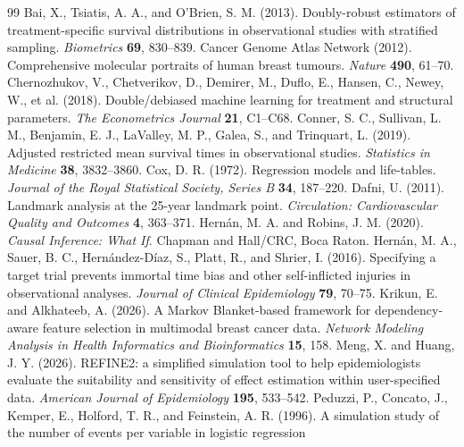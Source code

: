 \documentclass[12pt,letterpaper]{article}
\begin{document}
\begin{thebibliography}{99}
 Bai, X., Tsiatis, A. A., and O'Brien, S. M. (2013).
Doubly-robust estimators of treatment-specific survival distributions in observational studies with stratified sampling.
\textit{Biometrics} \textbf{69}, 830--839.
 Cancer Genome Atlas Network (2012).
Comprehensive molecular portraits of human breast tumours. \textit{Nature} \textbf{490}, 61--70.
 Chernozhukov, V., Chetverikov, D., Demirer, M.,
Duflo, E., Hansen, C., Newey, W., et al. (2018). Double/debiased machine learning for treatment
and structural parameters. \textit{The Econometrics Journal} \textbf{21}, C1--C68.
 Conner, S. C., Sullivan, L. M., Benjamin, E. J., LaValley, M. P.,
Galea, S., and Trinquart, L. (2019). Adjusted restricted mean survival times in observational studies.
\textit{Statistics in Medicine} \textbf{38}, 3832--3860.
 Cox, D. R. (1972). Regression models and life-tables.
\textit{Journal of the Royal Statistical Society, Series B} \textbf{34}, 187--220.
 Dafni, U. (2011). Landmark analysis at the 25-year landmark point.
\textit{Circulation: Cardiovascular Quality and Outcomes} \textbf{4}, 363--371.
 Hern\'an, M. A. and Robins, J. M. (2020).
\textit{Causal Inference: What If}. Chapman and Hall/CRC, Boca Raton.
 Hern\'an, M. A., Sauer, B. C., Hern\'andez-D\'iaz, S.,
Platt, R., and Shrier, I. (2016). Specifying a target trial prevents immortal time bias and
other self-inflicted injuries in observational analyses. \textit{Journal of Clinical Epidemiology} \textbf{79}, 70--75.
 Krikun, E. and Alkhateeb, A. (2026).
A Markov Blanket-based framework for dependency-aware feature selection in multimodal breast cancer data.
\textit{Network Modeling Analysis in Health Informatics and Bioinformatics} \textbf{15}, 158.
 Meng, X. and Huang, J. Y. (2026).
REFINE2: a simplified simulation tool to help epidemiologists evaluate the suitability and sensitivity
of effect estimation within user-specified data. \textit{American Journal of Epidemiology} \textbf{195}, 533--542.
 Peduzzi, P., Concato, J., Kemper, E., Holford, T. R.,
and Feinstein, A. R. (1996). A simulation study of the number of events per variable in logistic regression

\end{thebibliography}
\end{document}

